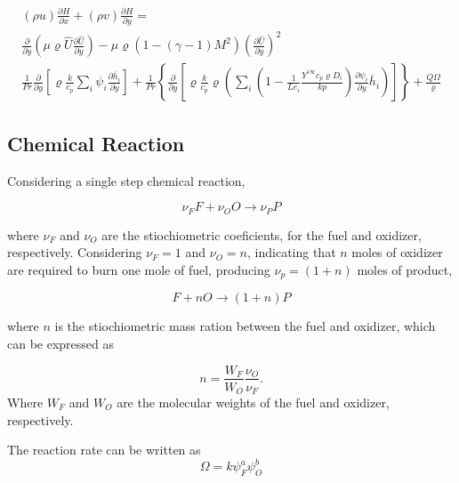 \begin{equation} 
\begin{split}
(\rho u)\frac{\partial H}{\partial x}    
+
(\rho v)\frac{\partial H}{\partial y}    
=
 \\
\frac{\partial}{\partial y}\left(\mu \varrho\hat{U}\frac{\partial \hat{U}}{\partial  y}\right)
-
\mu 
\varrho
\left(
1-
(\gamma-1)M^2
\right)
\left(
\frac{\partial \hat{U}}{\partial y}
\right)
^2
\\
\frac{1}{Pr}
\frac{\partial}{\partial y}
\left[
       \varrho
       \frac{k}{c_p}
       \sum_{i} \psi_i \frac{\partial \overline{h}_i}{\partial y}
\right]
+
\frac{1}{Pr}
\left\{
\frac{\partial}{\partial y}
\left[
\varrho
\frac{k}{c_p}
\varrho
\left(
       \sum_{i} 
       \left(
       1
       -
       \frac{1}{Le_i}
       \frac{Y^{i\infty}c_p
       \varrho D_i}{kp}
       \right)
       \frac{\partial \psi_i}{\partial y} \overline{h}_i
\right)
\right]
\right\}
+
\frac{Q\Omega}{\varrho}
\end{split}
\end{equation}       


\subsection{Chemical Reaction}

Considering a single step chemical reaction,

\begin{equation}
\nu_F F + \nu_O O \rightarrow \nu_P P
\end{equation}

where $\nu_F$ and $\nu_O$
are the stiochiometric coeficients, for the 
fuel and oxidizer, respectively. 
Considering $\nu_F=1$ and $\nu_O=n$, indicating that $n$ moles of oxidizer are
required to burn one mole of fuel, producing $\nu_p=(1+n)$ moles of product,

\begin{equation}
F + n O \rightarrow (1+n)P
\end{equation}

where $n$ is the stiochiometric 
mass ration between the fuel and oxidizer, which can be expressed as

\begin{equation}
n=\frac{W_F}{W_O}\frac{\nu_O}{\nu_F}
.
\end{equation}
Where $W_F$ and $W_O$ are the molecular weights of the fuel and oxidizer, respectively.

The reaction rate can be written as
\begin{equation}
\Omega=k\psi_F^a \psi_O^b
\end{equation}

